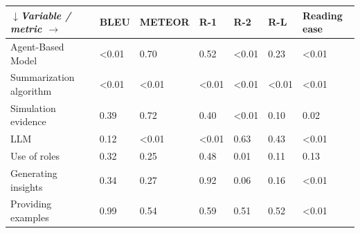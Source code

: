 \begin{tabular}{|l|l|l|l|l|l|l|}
\hline
\textit{$\downarrow$Variable / metric $\rightarrow$} & BLEU & METEOR & R-1 & R-2 & R-L & Reading ease \\
 \hline
 Agent-Based Model & \textless{}0.01 & 0.70 & 0.52 & \textless{}0.01 & 0.23 & \textless{}0.01 \\
 \hline
 Summarization algorithm & \textless{}0.01 & \textless{}0.01 & \textless{}0.01 & \textless{}0.01 & \textless{}0.01 & \textless{}0.01 \\
 \hline
 Simulation evidence & 0.39 & 0.72 & 0.40 & \textless{}0.01 & 0.10 & 0.02 \\
 \hline
 LLM & 0.12 & \textless{}0.01 & \textless{}0.01 & 0.63 & 0.43 & \textless{}0.01 \\
 \hline
 Use of roles & 0.32 & 0.25 & 0.48 & 0.01 & 0.11 & 0.13 \\
 \hline
 Generating insights & 0.34 & 0.27 & 0.92 & 0.06 & 0.16 & \textless{}0.01 \\
 \hline
 Providing examples & 0.99 & 0.54 & 0.59 & 0.51 & 0.52 & \textless{}0.01 \\
\hline
\end{tabular}
